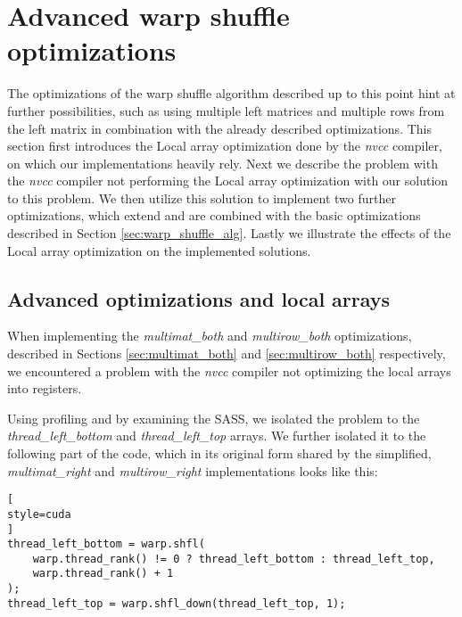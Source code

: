 
\section{Advanced warp shuffle optimizations}

The optimizations of the warp shuffle algorithm described up to this point hint at further possibilities, such as using multiple left matrices and multiple rows from the left matrix in combination with the already described optimizations. This section first introduces the Local array optimization done by the \textit{nvcc} compiler, on which our implementations heavily rely. Next we describe the problem with the \textit{nvcc} compiler not performing the Local array optimization with our solution to this problem. We then utilize this solution to implement two further optimizations, which extend and are combined with the basic optimizations described in Section \ref{sec:warp_shuffle_alg}. Lastly we illustrate the effects of the Local array optimization on the implemented solutions.

\subsection{Advanced optimizations and local arrays}
\label{sec:local_array_optimization_code_changes}

When implementing the \textit{multimat\_both} and \textit{multirow\_both} optimizations, described in Sections \ref{sec:multimat_both} and \ref{sec:multirow_both} respectively, we encountered a problem with the \textit{nvcc} compiler not optimizing the local arrays into registers. 

Using profiling and by examining the SASS, we isolated the problem to the \textit{thread\_left\_bottom} and \textit{thread\_left\_top} arrays. We further isolated it to the following part of the code, which in its original form shared by the simplified, \textit{multimat\_right} and \textit{multirow\_right} implementations looks like this:

\begin{lstlisting}[
style=cuda
]
thread_left_bottom = warp.shfl(
	warp.thread_rank() != 0 ? thread_left_bottom : thread_left_top,
	warp.thread_rank() + 1
);
thread_left_top = warp.shfl_down(thread_left_top, 1);
\end{lstlisting}

